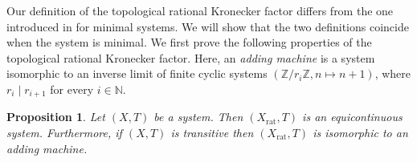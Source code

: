 \documentclass[11pt,reqno]{amsart}
\newcommand{\Z}{\mathbb{Z}}
\newcommand{\N}{\mathbb{N}}
\newtheorem{proposition}[proposition]{Proposition}
\theoremstyle{definition}
\theoremstyle{remark}
\begin{document}
Our definition of the topological rational Kronecker factor differs from the one introduced in \cite{Glasscock_Koutsogiannis_Richter_mult_comb_return:2019} for minimal systems. We will show that the two definitions coincide when the system is minimal. We first prove the following properties of the topological rational Kronecker factor. Here, an \emph{adding machine} is a system isomorphic to an inverse limit of finite cyclic systems $(\Z/r_i\Z,n\mapsto n+1)$, where $r_i\mid r_{i+1}$ for every $i\in\N$.

\begin{proposition}
    Let $(X,T)$ be a system. Then $(X_{\operatorname{rat}},T)$ is an equicontinuous system. Furthermore, if $(X,T)$ is transitive then $(X_{\operatorname{rat}},T)$ is isomorphic to an adding machine.
\end{proposition}
\end{document}
